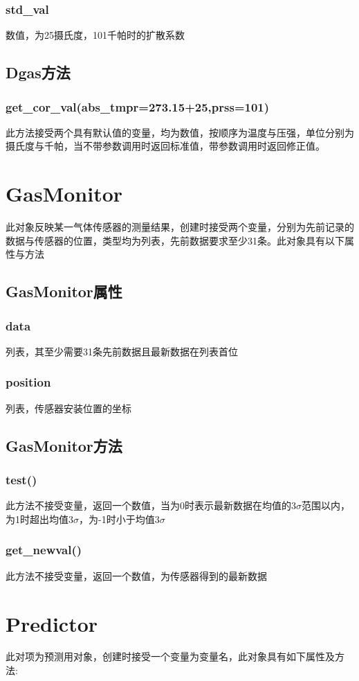 \documentclass[]{ctexart}
\begin{document}
\subsubsection{std\_val}
数值，为25摄氏度，101千帕时的扩散系数
\subsection{Dgas方法}
\subsubsection{get\_cor\_val(abs\_tmpr=273.15+25,prss=101)}
此方法接受两个具有默认值的变量，均为数值，按顺序为温度与压强，单位分别为摄氏度与千帕，当不带参数调用时返回标准值，带参数调用时返回修正值。
\section{GasMonitor}
此对象反映某一气体传感器的测量结果，创建时接受两个变量，分别为先前记录的数据与传感器的位置，类型均为列表，先前数据要求至少31条。此对象具有以下属性与方法
\subsection{GasMonitor属性}
\subsubsection{data}
列表，其至少需要31条先前数据且最新数据在列表首位
\subsubsection{position}
列表，传感器安装位置的坐标
\subsection{GasMonitor方法}
\subsubsection{test()}
此方法不接受变量，返回一个数值，当为0时表示最新数据在均值的$3\sigma$范围以内，为1时超出均值$3\sigma$，为-1时小于均值$3\sigma$
\subsubsection{get\_newval()}
此方法不接受变量，返回一个数值，为传感器得到的最新数据
\section{Predictor}
此对项为预测用对象，创建时接受一个变量为变量名，此对象具有如下属性及方法:
\end{document}
